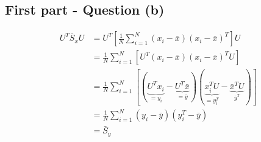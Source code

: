\documentclass[12pt]{article}
\begin{document}
\subsection{First part - Question (b)}
\begin{align*}
    U^T \bar S_x U
     & = U^T \left[ \frac{1}{N} \sum_{i=1}^{N}\left(x_{i}-\bar{x}\right)\left(x_{i}-\bar{x}\right)^{T} \right] U                                                                                                         \\
     & = \frac{1}{N} \sum_{i=1}^{N} \left[ U^T \left(x_{i}-\bar{x}\right)\left(x_{i}-\bar{x}\right)^{T} U \right]                                                                                                        \\
     & = \frac{1}{N} \sum_{i=1}^{N} \left[ \left( \underbrace{U^T x_{i}}_{=y_i} - \underbrace{U^T \bar{x}}_{=\bar y}\right) \left( \underbrace{x_{i}^T U}_{=y_i^T} - \underbrace{\bar{x}^T U}_{\bar y^T} \right) \right] \\
     & = \frac{1}{N} \sum_{i=1}^{N} \left( y_{i} - \bar{y}\right) \left( y_i^T - \bar{y} \right)                                                                                                                         \\
     & = \bar S_y                                                                                                                                                                                                        \\
\end{align*}
\end{document}
